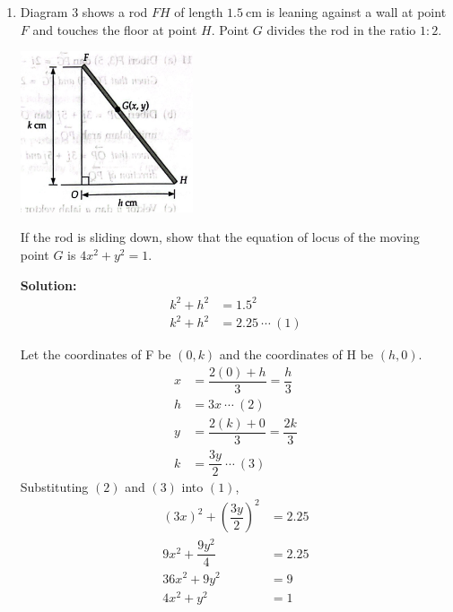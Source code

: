 \documentclass{report}
\newcommand{\sol}{\textbf{Solution:}}
\begin{document}
\begin{enumerate}[leftmargin=*]
    \item Diagram 3 shows a rod $F H$ of length $1.5 \mathrm{~cm}$ is leaning against a
          wall at point $F$ and touches the floor at point $H$. Point $G$ divides the rod
          in the ratio $1: 2$.
          \begin{center}
              \includegraphics[width=0.4\textwidth]{./assets/p1.9.png}
          \end{center}

          If the rod is sliding down, show that the equation of locus of the moving point
          $G$ is $4 x^2+y^2=1$.

          \sol{}
          \begin{align*}
              k^2 + h^2 & = 1.5^2             \\
              k^2 + h^2 & = 2.25\ \cdots\ (1)
          \end{align*}

          Let the coordinates of F be $(0, k)$ and the coordinates of H be $(h, 0)$.
          \begin{align*}
              x & = \dfrac{2(0) + h}{3} = \dfrac{h}{3}  \\
              h & = 3x\ \cdots\ (2)                     \\
              y & = \dfrac{2(k) + 0}{3} = \dfrac{2k}{3} \\
              k & = \dfrac{3y}{2}\ \cdots\ (3)
          \end{align*}
          Substituting $(2)$ and $(3)$ into $(1)$,
          \begin{align*}
              \left(3x\right)^2 + \left(\dfrac{3y}{2}\right)^2 & = 2.25 \\
              9x^2 + \dfrac{9y^2}{4}                           & = 2.25 \\
              36x^2 + 9y^2                                     & = 9    \\
              4x^2 + y^2                                       & = 1
          \end{align*}


\end{enumerate}
\end{document}
